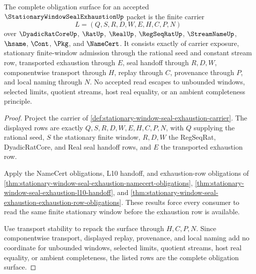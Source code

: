 \begin{theorem}
\label{thm:stationary-window-seal-exhaustion-obligation-surface}
The complete obligation surface for an accepted $\StationaryWindowSealExhaustionUp$ packet is the finite carrier
$$
L=(Q,S,R,D,W,E,H,C,P,N)
$$
over $\DyadicRatCoreUp$, $\RatUp$, $\RealUp$, $\RegSeqRatUp$, $\StreamNameUp$, $\hsame$, $\Cont$, $\Pkg$, and $\NameCert$. It consists exactly of carrier exposure, stationary finite-window admission through the rational seed and constant stream row, transported exhaustion through $E$, seal handoff through $R,D,W$, componentwise transport through $H$, replay through $C$, provenance through $P$, and local naming through $N$. No accepted read escapes to unbounded windows, selected limits, quotient streams, host real equality, or an ambient completeness principle.
\end{theorem}
\begin{proof}
Project the carrier of \autoref{def:stationary-window-seal-exhaustion-carrier}. The displayed rows are exactly $Q,S,R,D,W,E,H,C,P,N$, with $Q$ supplying the rational seed, $S$ the stationary finite window, $R,D,W$ the RegSeqRat, DyadicRatCore, and Real seal handoff rows, and $E$ the transported exhaustion row.

Apply the NameCert obligations, L10 handoff, and exhaustion-row obligations of \autoref{thm:stationary-window-seal-exhaustion-namecert-obligations}, \autoref{thm:stationary-window-seal-exhaustion-l10-handoff}, and \autoref{thm:stationary-window-seal-exhaustion-exhaustion-row-obligations}. These results force every consumer to read the same finite stationary window before the exhaustion row is available.

Use transport stability to repack the surface through $H,C,P,N$. Since componentwise transport, displayed replay, provenance, and local naming add no coordinate for unbounded windows, selected limits, quotient streams, host real equality, or ambient completeness, the listed rows are the complete obligation surface.
\end{proof}

